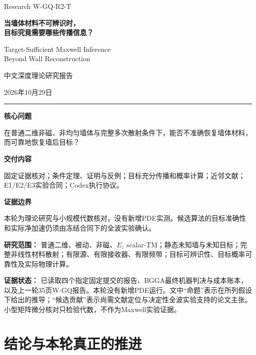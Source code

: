 \documentclass[
  10pt,
  a4paper,
]{article}
\author{}
\date{}
\let\originaltableofcontents\tableofcontents
\renewcommand{\tableofcontents}{\originaltableofcontents\clearpage}
\begin{document}
\begin{titlepage}
\thispagestyle{empty}
\vspace*{18mm}
{\color{blue!45!black}\Large Research W-GQ-R2-T\par}
\vspace{12mm}
{\LARGE\bfseries 当墙体材料不可辨识时，\\[5mm]目标究竟需要哪些传播信息？\par}
\vspace{12mm}
{\large Target-Sufficient Maxwell Inference\\[3mm]Beyond Wall Reconstruction\par}
\vspace{16mm}
{\large 中文深度理论研究报告\par}
\vspace{5mm}
{2026年10月29日\par}
\vfill
\noindent\rule{\textwidth}{0.6pt}
\vspace{4mm}
\textbf{核心问题}\par
在普通二维非磁、非均匀墙体与完整多次散射条件下，能否不准确恢复墙体材料，而可靠地恢复墙后目标？\par
\vspace{5mm}
\textbf{交付内容}\par
固定证据核对；条件定理、证明与反例；目标充分传播和概率计算；近邻文献；E1/E2/E3实验合同；Codex执行协议。\par
\vspace{5mm}
\textbf{证据边界}\par
本轮为理论研究与小规模代数核对，没有新增PDE实测。候选算法的目标准确性和实际净加速仍须由冻结合同下的全波实验确认。\par
\vspace{10mm}
\end{titlepage}

{
\hypersetup{linkcolor=}
\setcounter{tocdepth}{2}
\tableofcontents
}
\textbf{研究范围：} 普通二维、被动、非磁、\(E_z\)
scalar-TM；静态未知墙与未知目标；完整非线性材料散射；有限源、有限接收器、有限频带；目标可辨识性、目标概率可靠性及实际物理计算。

\textbf{证据状态：}
已读取四个指定固定提交的报告、BGGA最终机器判决与成本账本，以及上一轮35页W-GQ报告。本轮没有新增PDE运行。文中``命题''表示在所列假设下给出的推导；``候选贡献''表示尚需文献定位与决定性全波实验支持的论文主张。小型矩阵微分核对只检验代数，不作为Maxwell实验证据。

\hypertarget{ux7ed3ux8bbaux4e0eux672cux8f6eux771fux6b63ux7684ux63a8ux8fdb}{%
\section{结论与本轮真正的推进}\label{ux7ed3ux8bbaux4e0eux672cux8f6eux771fux6b63ux7684ux63a8ux8fdb}}
\end{document}
